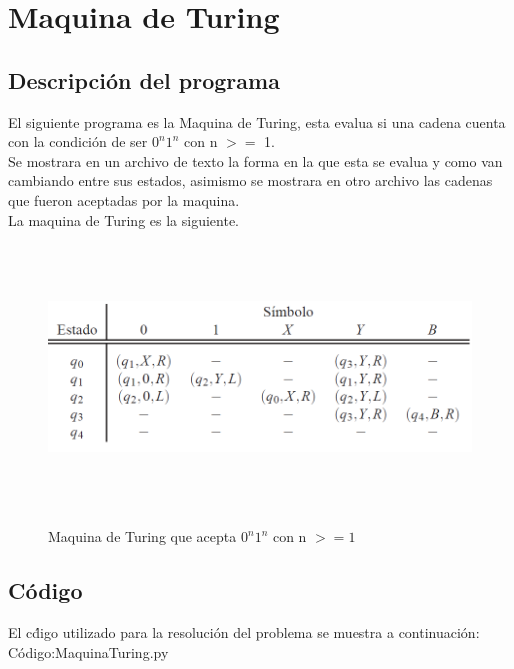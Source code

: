 \section{Maquina de Turing}
\subsection{ Descripci\'on del programa}
\justify
El siguiente programa es la Maquina de Turing, esta evalua si una cadena cuenta con la condici\'on de ser $0^n 1^n $ con n $>=$ 1.\\
Se mostrara en un archivo de texto la forma en la que esta se evalua y como van cambiando entre sus estados, asimismo se mostrara en otro archivo las cadenas que fueron aceptadas por la maquina.\\
La maquina de Turing es la siguiente.\\

\begin{figure}[H]
\includegraphics[width=\textwidth, height=7cm]{MT.png}
\label{fig:MT}
\caption{Maquina de Turing que acepta $0^n 1^n$ con n $>=1$}
\end{figure}

\subsection{C\'odigo}
El c\'digo utilizado para la resoluci\'on del problema se muestra a continuaci\'on:\\

C\'odigo:MaquinaTuring.py

